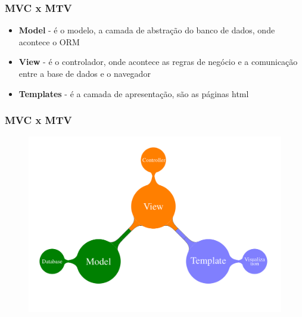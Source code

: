 \documentclass[aspectratio=169]{beamer}
\begin{document}
\begin{frame}\frametitle{MVC x MTV}

\begin{itemize}
	\item {\bf Model} - \'e o modelo, a camada de abstra\c c\~ao do banco de dados, onde acontece o ORM
	\item {\bf View} - \'e o controlador, onde acontece as regras de neg\'ocio e a comunica\c c\~ao entre a base de dados e o navegador
	\item {\bf Templates} - \'e a camada de apresenta\c c\~ao, s\~ao as p\'aginas html
\end{itemize}

\end{frame}

\begin{frame}\frametitle{MVC x MTV}
	\begin{figure}[h]
	  \centering
  		\includegraphics[height=.9\paperheight]{img/mtv1.png}
	\end{figure}
\end{frame}
\end{document}
